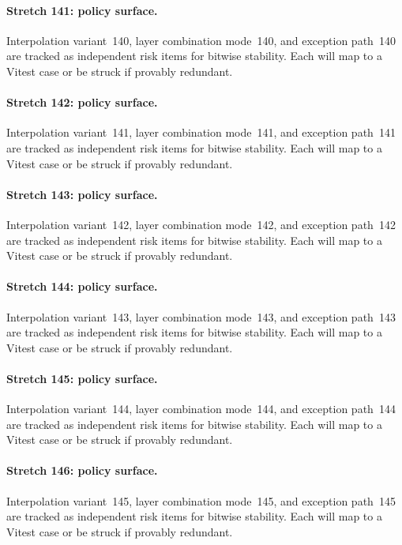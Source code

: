 \documentclass[sigconf,nonacm]{acmart}
\begin{document}
\paragraph{Stretch 141: policy surface.}
Interpolation variant~140, layer combination mode~140, and exception path~140 are tracked as independent risk items for bitwise stability. Each will map to a Vitest case or be struck if provably redundant. %

\paragraph{Stretch 142: policy surface.}
Interpolation variant~141, layer combination mode~141, and exception path~141 are tracked as independent risk items for bitwise stability. Each will map to a Vitest case or be struck if provably redundant. %

\paragraph{Stretch 143: policy surface.}
Interpolation variant~142, layer combination mode~142, and exception path~142 are tracked as independent risk items for bitwise stability. Each will map to a Vitest case or be struck if provably redundant. %

\paragraph{Stretch 144: policy surface.}
Interpolation variant~143, layer combination mode~143, and exception path~143 are tracked as independent risk items for bitwise stability. Each will map to a Vitest case or be struck if provably redundant. %

\paragraph{Stretch 145: policy surface.}
Interpolation variant~144, layer combination mode~144, and exception path~144 are tracked as independent risk items for bitwise stability. Each will map to a Vitest case or be struck if provably redundant. %

\paragraph{Stretch 146: policy surface.}
Interpolation variant~145, layer combination mode~145, and exception path~145 are tracked as independent risk items for bitwise stability. Each will map to a Vitest case or be struck if provably redundant. %
\end{document}
